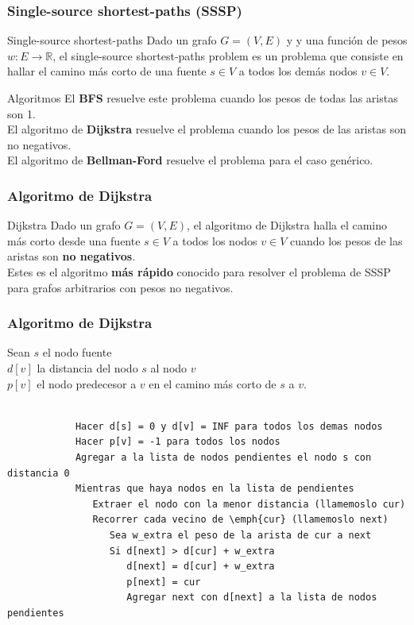\documentclass{beamer}
\begin{document}
	\begin{frame}
		\frametitle{Single-source shortest-paths (SSSP)}
		\begin{block}{Single-source shortest-paths}
			Dado un grafo $G = (V, E)$ y y una función de pesos $w : E \rightarrow \mathbb{R}$, el single-source shortest-paths problem es un problema que consiste en hallar el camino más corto de una fuente $s \in V$ a todos los demás nodos $v \in V$.\\
		\end{block}
		\begin{exampleblock}{Algoritmos}
			El \textbf{BFS} resuelve este problema cuando los pesos de todas las aristas son 1.\\
			El algoritmo de \textbf{Dijkstra} resuelve el problema cuando los pesos de las aristas son no negativos.\\
			El algoritmo de \textbf{Bellman-Ford} resuelve el problema para el caso genérico.
		\end{exampleblock}
	\end{frame}
	
	\begin{frame}
		\frametitle{Algoritmo de Dijkstra}
		\begin{block}{Dijkstra}
			Dado un grafo $G = (V, E)$, el algoritmo de Dijkstra halla el camino más corto desde una fuente $s \in V$ a todos los nodos $v \in V$ cuando los pesos de las aristas son \textbf{no negativos}.\\
			Estes es el algoritmo \textbf{más rápido} conocido para resolver el problema de SSSP para grafos arbitrarios con pesos no negativos.
		\end{block}
	\end{frame}
	
	\begin{frame}[fragile]
		\frametitle{Algoritmo de Dijkstra}
		Sean $s$ el nodo fuente\\
		\qquad $d[v]$ la distancia del nodo $s$ al nodo $v$\\
		\qquad $p[v]$ el nodo predecesor a $v$ en el camino más corto de $s$ a $v$.\\ \quad \\
		\begin{lstlisting}
			Hacer d[s] = 0 y d[v] = INF para todos los demas nodos
			Hacer p[v] = -1 para todos los nodos
			Agregar a la lista de nodos pendientes el nodo s con distancia 0
			Mientras que haya nodos en la lista de pendientes
			   Extraer el nodo con la menor distancia (llamemoslo cur)
			   Recorrer cada vecino de \emph{cur} (llamemoslo next)
			      Sea w_extra el peso de la arista de cur a next
			      Si d[next] > d[cur] + w_extra
			         d[next] = d[cur] + w_extra
			         p[next] = cur
			         Agregar next con d[next] a la lista de nodos pendientes
		\end{lstlisting}
	\end{frame}
	
\end{document}
